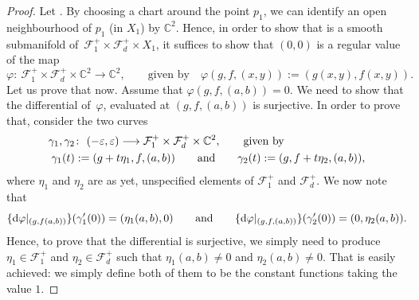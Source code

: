 \begin{proof}
Let .
By choosing a chart around the point $p_1$, we can identify an open neighbourhood of
$p_1$ (in $X_1$) by $\mathbb{C}^2$. Hence, in order to show that
 is a smooth
submanifold of~${\mathcal{F}_1^{+} \times \mathcal{F}_d^{+} \times X_1}$, it suffices to show that
$(0,0)$ is a regular value of the map
\[\varphi \colon\ \mathcal{F}_1^{+} \times \mathcal{F}_d^{+} \times \mathbb{C}^2 \longrightarrow
\mathbb{C}^2,
\qquad \text{given by}
\quad \varphi(g, f, (x, y)) := (g(x, y), f(x, y)).\]
Let us prove that now. Assume that $\varphi(g,f,(a,b))=0$.
We need to show that the differential of~$\varphi$,
evaluated at $(g, f, (a, b))$ is surjective.
In order to prove that, consider the two curves
\begin{align*}
\gamma_1, \gamma_2&\colon\ (-\varepsilon, \varepsilon)\longrightarrow
\mathcal{F}_1^{+} \times \mathcal{F}_d^{+} \times \mathbb{C}^2,
\qquad \textnormal{given by} \\
\gamma_1(t)&:= (g + t\eta_1, f, (a, b)) \qquad \textnormal{and}
\qquad \gamma_2(t):= (g, f+t\eta_2, (a, b)),
\end{align*}
where
$\eta_1$ and $\eta_2$ are as yet, unspecified elements of
$\mathcal{F}_1^{+}$ and $\mathcal{F}_d^{+}$.
We now note that
\[\{{\rm d}\varphi|_{(g,f(a,b))}\}(\gamma_1^{\prime}(0)) = (\eta_1(a,b), 0)
\qquad \textnormal{and} \qquad \{{\rm d}\varphi|_{(g,f,(a,b))}\}(\gamma_2^{\prime}(0)) = (0, \eta_2(a,b)).\]
Hence, to prove that the differential is surjective, we simply need to produce
$\eta_1 \in \mathcal{F}_1^{+}$ and $\eta_2 \in \mathcal{F}_d^{+}$
such that $\eta_1(a,b) \neq 0$ and $\eta_2(a,b) \neq 0$.
That is easily achieved: we simply define both of them to be the constant functions
taking the value $1$.


\end{proof}
